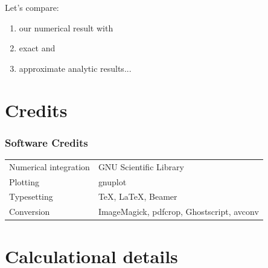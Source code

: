 \documentclass[aspectratio=169]{beamer}
\begin{document}
\begin{frame}
Let's \alert{compare}:

\begin{enumerate}
\pause
\item our \alert<2>{numerical} result with
\pause
\item \alert<3>{exact} and
\pause
\item \alert<4>{approximate} analytic results...
\end{enumerate}
\end{frame}




\section{Credits}

\begin{frame}
\frametitle{Software Credits}

\begin{tabular}{ll}
Numerical integration&GNU Scientific Library \\

Plotting&gnuplot \\

Typesetting&\TeX, \LaTeX, Beamer \\

Conversion&ImageMagick, pdfcrop, Ghostscript, avconv \\
\end{tabular}
\end{frame}


\section{Calculational details}
\end{document}
